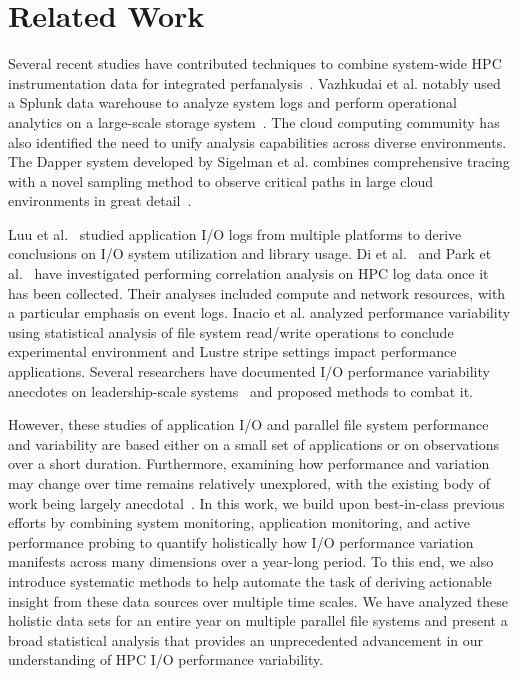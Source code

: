 \section{Related Work} \label{sec:related}

Several recent studies have contributed techniques to combine
system-wide HPC instrumentation data for integrated
perfanalysis~\cite{Lockwood2017,Vazhkudai2017guide,Agelastos2014ldms,Kunkel2014siox,RIOT_2013}.
Vazhkudai et al. notably used a Splunk data warehouse to analyze system
logs and perform operational analytics on a large-scale storage system~\cite{Vazhkudai2017guide}.
The cloud computing community has also identified the need to unify
analysis capabilities across diverse environments.
The Dapper system
developed by Sigelman et al. combines comprehensive tracing with a novel
sampling method to observe critical paths in large cloud environments in great
detail~\cite{Sigelman2010dapper}.

Luu et al.~\cite{Luu:2015:HPDC} studied application I/O logs from multiple platforms to derive conclusions on I/O system utilization and library usage.
Di et al.~\cite{7973730} and Park et al.~\cite{Park2017BigDM} have
investigated performing correlation analysis on HPC log data once it has been
collected.  Their analyses included compute and network resources, with a
particular emphasis on event logs. Inacio et al. analyzed performance variability using statistical analysis of file system read/write operations to conclude experimental environment and Lustre stripe settings impact performance applications. 
Several researchers have documented 
I/O performance variability anecdotes on leadership-scale
systems~\cite{Lofstead2010,Yildiz2016,carns2011understanding} and proposed
methods to combat it.  

However, these studies of application I/O and parallel file system performance and variability are based either on a small set of applications or on observations over a short duration.
Furthermore, examining how performance and variation may change over time remains relatively unexplored, with the existing body of work being largely anecdotal~\cite{Haryadi2018fail}.
In this work, we build upon best-in-class previous efforts by combining system monitoring, application monitoring, and active performance probing
to quantify holistically how I/O performance variation manifests across many dimensions over a year-long period.
To this end, we also introduce systematic methods to help automate the task of deriving actionable insight from these data sources over multiple time scales.
We have analyzed these holistic data sets for an entire year on multiple parallel file systems and present a broad statistical analysis that provides an unprecedented advancement in our understanding of HPC I/O performance variability.